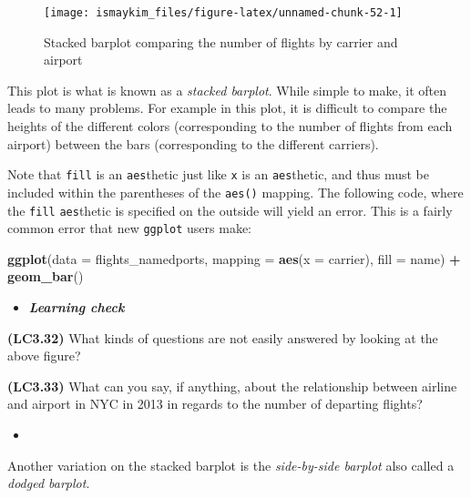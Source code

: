 \documentclass[12pt,]{krantz}
\makeatletter
\newenvironment{Shaded}{\begin{snugshade}}{\end{snugshade}}
\newcommand{\KeywordTok}[1]{\textcolor[rgb]{0.27,0.27,0.27}{\textbf{#1}}}
\newcommand{\DataTypeTok}[1]{\textcolor[rgb]{0.27,0.27,0.27}{#1}}
\newcommand{\StringTok}[1]{\textcolor[rgb]{0.5,0.5,0.5}{#1}}
\newcommand{\OperatorTok}[1]{\textcolor[rgb]{0.43,0.43,0.43}{\textbf{#1}}}
\newcommand{\NormalTok}[1]{#1}
\newenvironment{kframe}{%
\medskip{}
\setlength{\fboxsep}{.8em}
 \def\at@end@of@kframe{}%
 \ifinner\ifhmode%
  \def\at@end@of@kframe{\end{minipage}}%
  \begin{minipage}{\columnwidth}%
 \fi\fi%
 \def\FrameCommand##1{\hskip\@totalleftmargin \hskip-\fboxsep
 \colorbox{shadecolor}{##1}\hskip-\fboxsep
     \hskip-\linewidth \hskip-\@totalleftmargin \hskip\columnwidth}%
 \MakeFramed {\advance\hsize-\width
   \@totalleftmargin\z@ \linewidth\hsize
   \@setminipage}}%
 {\par\unskip\endMakeFramed%
 \at@end@of@kframe}
\renewenvironment{Shaded}{\begin{kframe}}{\end{kframe}}
\newenvironment{rmdblock}[1]
  {\begin{shaded*}
  \begin{itemize}
  \renewcommand{\labelitemi}{
    \raisebox{-.7\height}[0pt][0pt]{
    }
  }
  \item
  }
  {
  \end{itemize}
  \end{shaded*}
  }
\newenvironment{learncheck}
  {\begin{rmdblock}{warning}}
  {\end{rmdblock}}
\theoremstyle{definition}
\theoremstyle{definition}
\theoremstyle{definition}
\theoremstyle{remark}
\makeatother
\begin{document}
\begin{figure}

{\centering \texttt{[image: ismaykim\_files/figure-latex/unnamed-chunk-52-1]} 

}

\caption{Stacked barplot comparing the number of flights by carrier and airport}\label{fig:unnamed-chunk-52}
\end{figure}

This plot is what is known as a \emph{stacked barplot}. While simple to
make, it often leads to many problems. For example in this plot, it is
difficult to compare the heights of the different colors (corresponding
to the number of flights from each airport) between the bars
(corresponding to the different carriers).

Note that \texttt{fill} is an \texttt{aes}thetic just like \texttt{x} is
an \texttt{aes}thetic, and thus must be included within the parentheses
of the \texttt{aes()} mapping. The following code, where the
\texttt{fill} \texttt{aes}thetic is specified on the outside will yield
an error. This is a fairly common error that new \texttt{ggplot} users
make:

\begin{Shaded}
\begin{Highlighting}[]
\KeywordTok{ggplot}\NormalTok{(}\DataTypeTok{data =}\NormalTok{ flights_namedports, }
       \DataTypeTok{mapping =} \KeywordTok{aes}\NormalTok{(}\DataTypeTok{x =}\NormalTok{ carrier), }\DataTypeTok{fill =}\NormalTok{ name) }\OperatorTok{+}
\StringTok{  }\KeywordTok{geom_bar}\NormalTok{()}
\end{Highlighting}
\end{Shaded}

\begin{learncheck}
\textbf{\emph{Learning check}}
\end{learncheck}

\textbf{(LC3.32)} What kinds of questions are not easily answered by
looking at the above figure?

\textbf{(LC3.33)} What can you say, if anything, about the relationship
between airline and airport in NYC in 2013 in regards to the number of
departing flights?

\begin{learncheck}

\end{learncheck}

Another variation on the stacked barplot is the \emph{side-by-side
barplot} also called a \emph{dodged barplot}.
\end{document}
